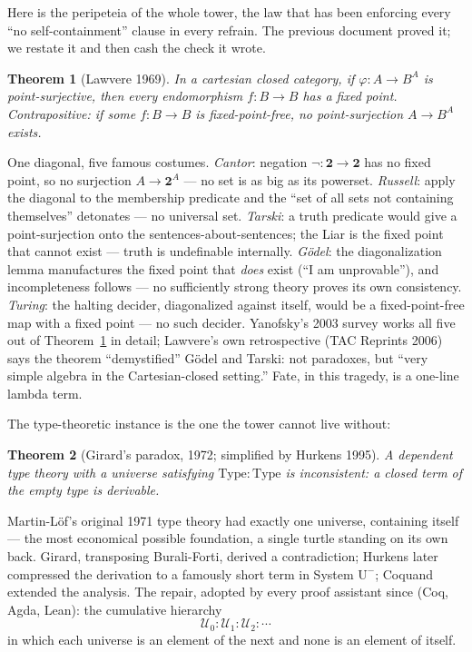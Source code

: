 \documentclass[11pt]{article}
\theoremstyle{plain}
\newtheorem{theorem}{Theorem}[section]
\theoremstyle{definition}
\theoremstyle{remark}
\newcommand{\U}{\mathcal{U}}
\begin{document}
Here is the peripeteia of the whole tower, the law that has been enforcing every ``no self-containment'' clause in every refrain. The previous document proved it; we restate it and then cash the check it wrote.

\begin{theorem}[Lawvere 1969]\label{thm:lawvere}
In a cartesian closed category, if $\varphi\colon A \to B^A$ is point-surjective, then every endomorphism $f\colon B \to B$ has a fixed point. Contrapositive: if some $f\colon B \to B$ is fixed-point-free, no point-surjection $A \to B^A$ exists.
\end{theorem}

One diagonal, five famous costumes. \emph{Cantor}: negation $\neg\colon \mathbf{2} \to \mathbf{2}$ has no fixed point, so no surjection $A \to \mathbf{2}^A$ --- no set is as big as its powerset. \emph{Russell}: apply the diagonal to the membership predicate and the ``set of all sets not containing themselves'' detonates --- no universal set. \emph{Tarski}: a truth predicate would give a point-surjection onto the sentences-about-sentences; the Liar is the fixed point that cannot exist --- truth is undefinable internally. \emph{G\"odel}: the diagonalization lemma manufactures the fixed point that \emph{does} exist (``I am unprovable''), and incompleteness follows --- no sufficiently strong theory proves its own consistency. \emph{Turing}: the halting decider, diagonalized against itself, would be a fixed-point-free map with a fixed point --- no such decider. Yanofsky's 2003 survey works all five out of Theorem~\ref{thm:lawvere} in detail; Lawvere's own retrospective (TAC Reprints 2006) says the theorem ``demystified'' G\"odel and Tarski: not paradoxes, but ``very simple algebra in the Cartesian-closed setting.'' Fate, in this tragedy, is a one-line lambda term.

The type-theoretic instance is the one the tower cannot live without:

\begin{theorem}[Girard's paradox, 1972; simplified by Hurkens 1995]\label{thm:girard}
A dependent type theory with a universe satisfying $\mathrm{Type} : \mathrm{Type}$ is inconsistent: a closed term of the empty type is derivable.
\end{theorem}

Martin-L\"of's original 1971 type theory had exactly one universe, containing itself --- the most economical possible foundation, a single turtle standing on its own back. Girard, transposing Burali-Forti, derived a contradiction; Hurkens later compressed the derivation to a famously short term in System $\mathrm{U}^-$; Coquand extended the analysis. The repair, adopted by every proof assistant since (Coq, Agda, Lean): the cumulative hierarchy
\[
\U_0 : \U_1 : \U_2 : \cdots
\]
in which each universe is an element of the next and none is an element of itself.
\end{document}
